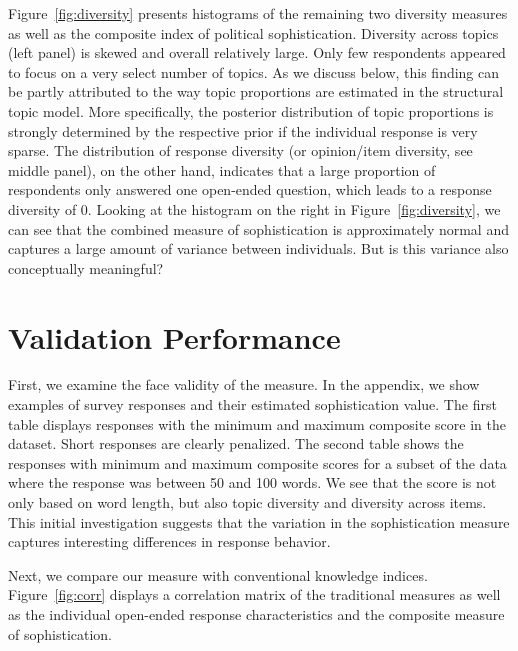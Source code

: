 \documentclass[12pt]{article}
\begin{document}
Figure~\ref{fig:diversity} presents histograms of the remaining two diversity measures as well as the composite index of political sophistication. Diversity across topics (left panel) is skewed and overall relatively large. Only few respondents appeared to focus on a very select number of topics. As we discuss below, this finding can be partly attributed to the way topic proportions are estimated in the structural topic model. More specifically, the posterior distribution of topic proportions is strongly determined by the respective prior if the individual response is very sparse. The distribution of response diversity (or opinion/item diversity, see middle panel), on the other hand, indicates that a large proportion of respondents only answered one open-ended question, which leads to a response diversity of 0. Looking at the histogram on the right in Figure~\ref{fig:diversity}, we can see that the combined measure of sophistication is approximately normal and captures a large amount of variance between individuals. But is this variance also conceptually meaningful?


\section{Validation Performance}

First, we examine the face validity of the measure. In the appendix, we show examples of survey responses and their estimated sophistication value. The first table displays responses with the minimum and maximum composite score in the dataset.  Short responses are clearly penalized. The second table shows the responses with minimum and maximum composite scores for a subset of the data where the response was between 50 and 100 words. We see that the score is not only based on word length, but also topic diversity and diversity across items. This initial investigation suggests that the variation in the sophistication measure captures interesting differences in response behavior.

Next, we compare our measure with conventional knowledge indices. Figure~\ref{fig:corr} displays a correlation matrix of the traditional measures as well as the individual open-ended response characteristics and the composite measure of sophistication.
\end{document}
